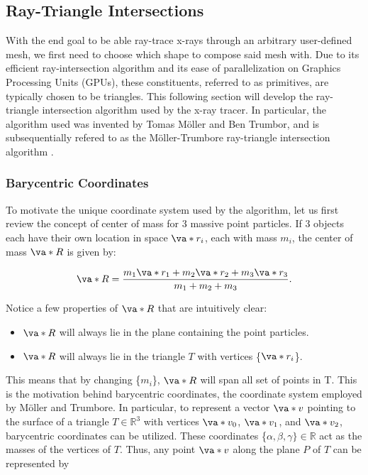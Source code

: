 \subsection{Ray-Triangle Intersections}
\par With the end goal to be able ray-trace x-rays through an arbitrary user-defined mesh, we first need to choose which shape to compose said mesh with. Due to its efficient ray-intersection algorithm and its ease of parallelization on Graphics Processing Units (GPUs), these constituents, referred to as primitives, are typically chosen to be triangles. This following section will develop the ray-triangle intersection algorithm used by the x-ray tracer. In particular, the algorithm used was invented by Tomas Möller and Ben Trumbor, and is subsequentially refered to as the Möller-Trumbore ray-triangle intersection algorithm \cite{moller2005fast}. 

\subsubsection*{Barycentric Coordinates}
\par To motivate the unique coordinate system used by the algorithm, let us first review the concept of center of mass for 3 massive point particles. If 3 objects each have their own location in space $\va*{r_i}$, each with mass $m_i$, the center of mass $\va*{R}$ is given by:

\begin{equation}
  \va*{R} = \frac{m_1 \va*{r_1} + m_2 \va*{r_2} + m_3 \va*{r_3}}{m_1 + m_2 + m_3}.
  \label{eq:com}
\end{equation}

Notice a few properties of $\va*{R}$ that are intuitively clear:

\begin{itemize}
\item $\va*{R}$ will always lie in the plane containing the point particles.
\item $\va*{R}$ will always lie in the triangle $T$ with vertices \{$\va*{r_i}$\}.
\end{itemize}

\noindent This means that by changing \{$m_i$\}, $\va*{R}$ will span all set of points in T. This is the motivation behind barycentric coordinates, the coordinate system employed by Möller and Trumbore. In particular, to represent a vector $\va*{v}$ pointing to the surface of a triangle $T \in \mathbb{R}^3$ with vertices $\va*{v_0}$, $\va*{v_1}$, and $\va*{v_2}$, barycentric coordinates can be utilized. These coordinates \{$\alpha, \beta, \gamma\}\in \mathbb{R}$ act as the masses of the vertices of $T$. Thus, any point $\va*{v}$ along the plane $P$ of $T$ can be represented by 

